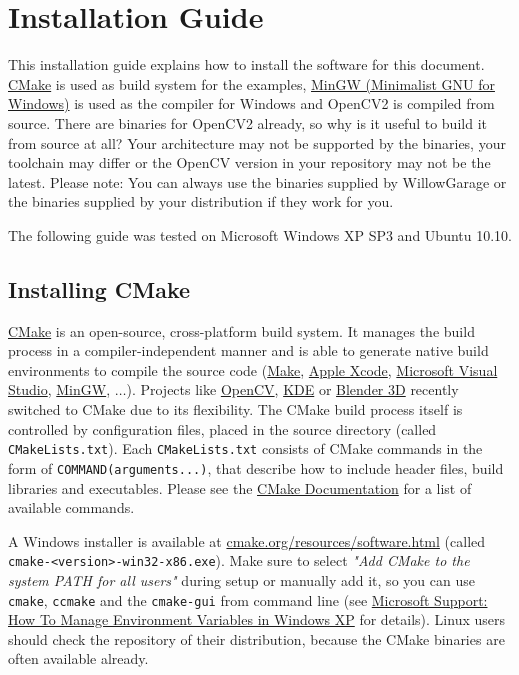 \section{Installation Guide}

This installation guide explains how to install the software for this document. \href{http://www.cmake.org}{CMake} is used as build system for the examples, \href{http://www.mingw.org}{MinGW (Minimalist GNU for Windows)} is used as the compiler for Windows and OpenCV2 is compiled from source. There are binaries for OpenCV2 already, so why is it useful to build it from source at all? Your architecture may not be supported by the binaries, your toolchain may differ or the OpenCV version in your repository may not be the latest. Please note: You can always use the binaries supplied by WillowGarage or the binaries supplied by your distribution if they work for you.

The following guide was tested on Microsoft Windows XP SP3 and Ubuntu 10.10.

\subsection{Installing CMake}
\label{ssection:cmake}

\lstset{
	language=sh,
}

\href{http://www.cmake.org}{CMake} is an open-source, cross-platform build system. It manages the build process in a compiler-independent manner and is able to generate native build environments to compile the source code (\href{http://www.gnu.org/software/make/manual/}{Make}, \href{http://developer.apple.com/technologies/tools/}{Apple Xcode}, \href{http://www.microsoft.com/visualstudio/en-us}{Microsoft Visual Studio}, \href{http://www.mingw.org}{MinGW}, $\ldots$). Projects like \href{http://opencv.willowgarage.com}{OpenCV}, \href{http://www.kde.org}{KDE} or \href{http://www.blender.org}{Blender 3D} recently switched to CMake due to its flexibility. The CMake build process itself is controlled by configuration files, placed in the source directory (called \lstinline|CMakeLists.txt|). Each \lstinline|CMakeLists.txt| consists of CMake commands in the form of \lstinline|COMMAND(arguments...)|, that describe how to include header files, build libraries and executables. Please see the \href{http://www.cmake.org/cmake/help/cmake-2-8-docs.html}{CMake Documentation} for a list of available commands.

A Windows installer is available at \href{http://www.cmake.org/cmake/resources/software.html}{cmake.org/resources/software.html} (called \lstinline|cmake-<version>-win32-x86.exe|). Make sure to select \textit{"Add CMake to the system PATH for all users"} during setup or manually add it, so you can use \lstinline|cmake|, \lstinline|ccmake| and the \lstinline|cmake-gui| from command line (see \href{http://support.microsoft.com/kb/310519}{Microsoft Support: How To Manage Environment Variables in Windows XP} for details). Linux users should check the repository of their distribution, because the CMake binaries are often available already. 

